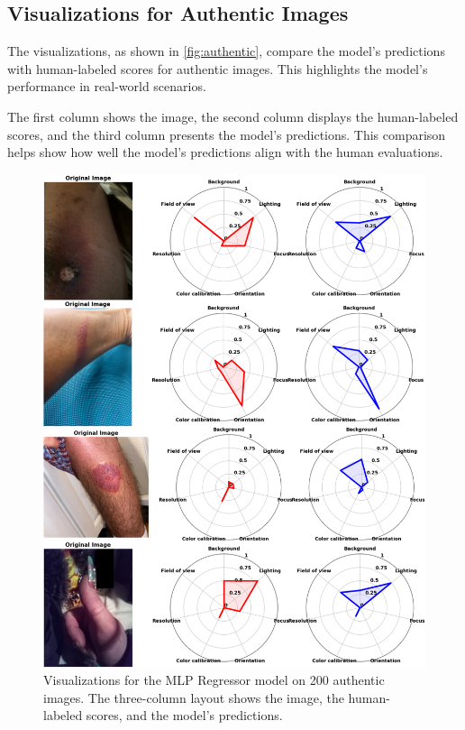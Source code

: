 \subsection{Visualizations for Authentic Images}
\label{subsec:AuthenticImages}
The visualizations, as shown in \autoref{fig:authentic}, compare the model's predictions with human-labeled scores for authentic images. This highlights the model's performance in real-world scenarios. \par
\vspace{\baselineskip}
\noindent
The first column shows the image, the second column displays the human-labeled scores, and the third column presents the model’s predictions. This comparison helps show how well the model’s predictions align with the human evaluations. \par
\begin{figure}[ht]
    \centering
    \includegraphics[keepaspectratio,width=15cm]{img/authentic.png}
    \caption{Visualizations for the MLP Regressor model on 200 authentic images. The three-column layout shows the image, the human-labeled scores, and the model's predictions.}
    \label{fig:authentic}
\end{figure}
\clearpage
